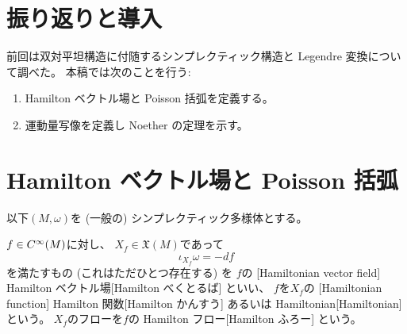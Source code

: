 \documentclass[report,dvipdfmx]{jlreq}
\begin{document}
%

%
\section*{振り返りと導入}

前回は双対平坦構造に付随するシンプレクティック構造と Legendre 変換について調べた。
本稿では次のことを行う:
\begin{enumerate}
    \item Hamilton ベクトル場と Poisson 括弧を定義する。
    \item 運動量写像を定義し Noether の定理を示す。
\end{enumerate}

%
\section{Hamilton ベクトル場と Poisson 括弧}

以下$(M, \omega)$を (一般の) シンプレクティック多様体とする。

\begin{definition}
    $f \in C^\infty(M)$に対し、
    $X_f \in \mathfrak{X}(M)$であって
    \begin{equation}
        \iota_{X_f} \omega = -df
    \end{equation}
    を満たすもの (これはただひとつ存在する) を
    $f$の
    [Hamiltonian vector field]
        {Hamilton ベクトル場}[Hamilton べくとるば]
    といい、
    $f$を$X_f$の
    [Hamiltonian function]
        {Hamilton 関数}[Hamilton かんすう]
    あるいは
        {Hamiltonian}[Hamiltonian]
    という。
    $X_f$のフローを$f$の
        {Hamilton フロー}[Hamilton ふろー]
    という。
\end{definition}
\end{document}
